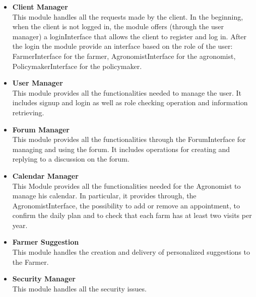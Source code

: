 \begin{itemize}
    \item \textbf{Client Manager}\\
        This module handles all the requests made by the client. In the beginning,
        when the client is not logged in, the module offers (through
        the user manager) a loginInterface that allows the client to register and log in. After the login the module
        provide an interface based on the role of the user: FarmerInterface for the farmer, AgronomistInterface for the agronomist,
        PolicymakerInterface for the policymaker.

    \item \textbf{User Manager}\\
        This module provides all the functionalities needed to manage the user. It includes signup and login as well as role checking 
        operation and information retrieving.
           
    \item \textbf{Forum Manager}\\
        This module provides all the functionalities through the ForumInterface for managing and using the forum. 
        It includes operations for creating and replying to a discussion on the forum.

    \item \textbf{Calendar Manager}\\
        This Module provides all the functionalities needed for the Agronomist to manage his calendar. In particular, it provides
        through, the AgronomistInterface, the possibility to add or remove an appointment, to confirm the daily plan and to check
        that each farm has at least two visits per year.

    \item \textbf{Farmer Suggestion}\\
        This module handles the creation and delivery of personalized suggestions to the Farmer. 

    \item \textbf{Security Manager}\\
        This module handles all the security issues.
\end{itemize}

\newpage
